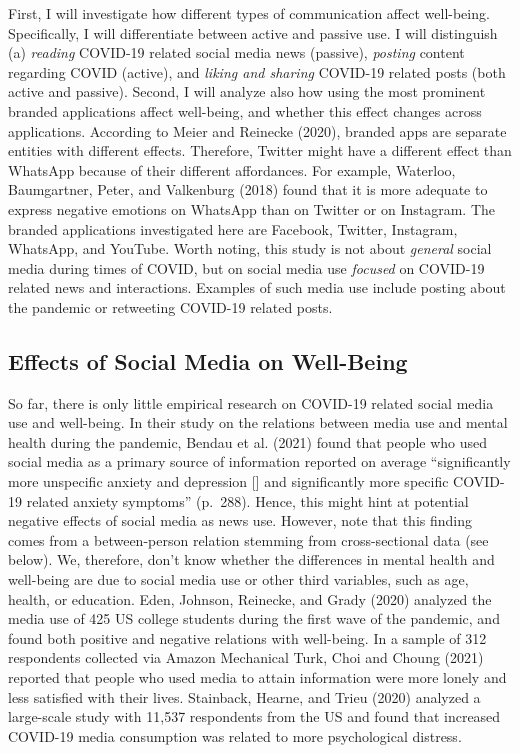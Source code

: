 \documentclass[
  english,
  man,mask,floatsintext]{apa6}
\begin{document}
First, I will investigate how different types of communication affect well-being.
Specifically, I will differentiate between active and passive use.
I will distinguish (a) \emph{reading} COVID-19 related social media news (passive), \emph{posting} content regarding COVID (active), and \emph{liking and sharing} COVID-19 related posts (both active and passive).
Second, I will analyze also how using the most prominent branded applications affect well-being, and whether this effect changes across applications.
According to Meier and Reinecke (2020), branded apps are separate entities with different effects.
Therefore, Twitter might have a different effect than WhatsApp because of their different affordances.
For example, Waterloo, Baumgartner, Peter, and Valkenburg (2018) found that it is more adequate to express negative emotions on WhatsApp than on Twitter or on Instagram.
The branded applications investigated here are Facebook, Twitter, Instagram, WhatsApp, and YouTube.
Worth noting, this study is not about \emph{general} social media during times of COVID, but on social media use \emph{focused} on COVID-19 related news and interactions.
Examples of such media use include posting about the pandemic or retweeting COVID-19 related posts.

\hypertarget{effects-of-social-media-on-well-being}{%
\subsection{Effects of Social Media on Well-Being}\label{effects-of-social-media-on-well-being}}

So far, there is only little empirical research on COVID-19 related social media use and well-being.
In their study on the relations between media use and mental health during the pandemic, Bendau et al. (2021) found that people who used social media as a primary source of information reported on average ``significantly more unspecific anxiety and depression {[}{]} and significantly more specific COVID-19 related anxiety symptoms'' (p.~288).
Hence, this might hint at potential negative effects of social media as news use.
However, note that this finding comes from a between-person relation stemming from cross-sectional data (see below).
We, therefore, don't know whether the differences in mental health and well-being are due to social media use or other third variables, such as age, health, or education.
Eden, Johnson, Reinecke, and Grady (2020) analyzed the media use of 425 US college students during the first wave of the pandemic, and found both positive and negative relations with well-being.
In a sample of 312 respondents collected via Amazon Mechanical Turk, Choi and Choung (2021) reported that people who used media to attain information were more lonely and less satisfied with their lives.
Stainback, Hearne, and Trieu (2020) analyzed a large-scale study with 11,537 respondents from the US and found that increased COVID-19 media consumption was related to more psychological distress.
\end{document}
